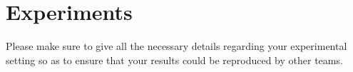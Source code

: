 \section{Experiments}
Please make sure to give all the necessary details regarding your experimental 
setting so as to ensure that your results could be reproduced by other teams. 